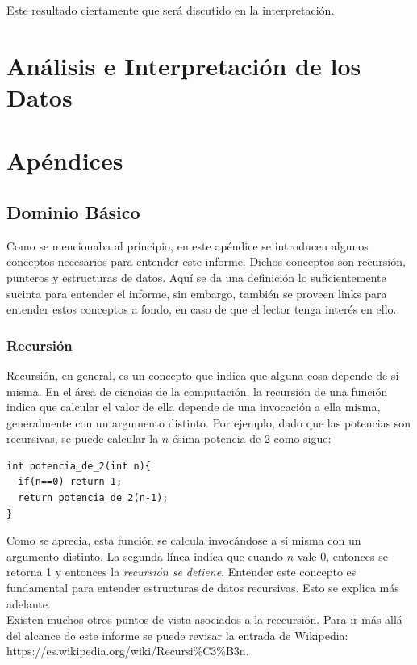\documentclass[12pt,letterpaper]{report}
\begin{document}
Este resultado ciertamente que será discutido en la interpretación.

\newpage
\section{Análisis e Interpretación de los Datos}



\newpage
\section{Apéndices}
\subsection{Dominio Básico}
\label{subsec:apen_dombasico}
Como se mencionaba al principio, en este apéndice se introducen algunos conceptos necesarios para entender este informe. Dichos conceptos son recursión, punteros y estructuras de datos. Aquí se da una definición lo suficientemente sucinta para entender el informe, sin embargo, también se proveen links para entender estos conceptos a fondo, en caso de que el lector tenga interés en ello.

\subsubsection{Recursión}

Recursión, en general, es un concepto que indica que alguna cosa depende de sí misma. En el área de ciencias de la computación, la recursión de una función indica que calcular el valor de ella depende de una invocación a ella misma, generalmente con un argumento distinto. Por ejemplo, dado que las potencias son recursivas, se puede calcular la $n$-ésima potencia de 2 como sigue:

\begin{verbatim}
int potencia_de_2(int n){
  if(n==0) return 1;
  return potencia_de_2(n-1);
}
\end{verbatim}

Como se aprecia, esta función se calcula invocándose a sí misma con un argumento distinto. La segunda línea indica que cuando $n$ vale 0, entonces se retorna 1 y entonces la \emph{recursión se detiene}. Entender este concepto es fundamental para entender estructuras de datos recursivas. Esto se explica más adelante.\\

Existen muchos otros puntos de vista asociados a la reccursión. Para ir más allá del alcance de este informe se puede revisar la entrada de Wikipedia: https://es.wikipedia.org/wiki/Recursi\%C3\%B3n.
\end{document}
